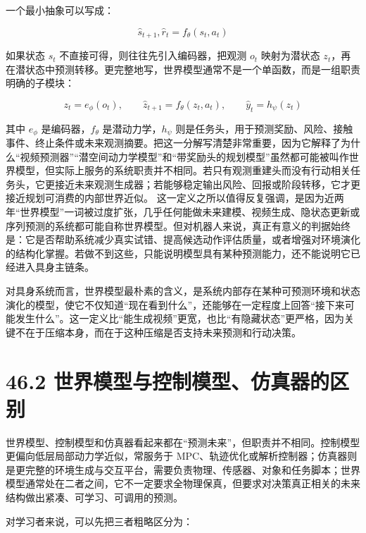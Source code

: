 一个最小抽象可以写成：

\begin{equation*}
\hat{s}_{t+1}, \hat{r}_t = f_\theta(s_t, a_t)
\end{equation*}

如果状态 \(s_t\) 不直接可得，则往往先引入编码器，把观测 \(o_t\) 映射为潜状态 \(z_t\)，再在潜状态中预测转移。更完整地写，世界模型通常不是一个单函数，而是一组职责明确的子模块：

\begingroup
\scriptsize
\begin{equation*}
z_t = e_\phi(o_t), \qquad
\hat{z}_{t+1} = f_\theta(z_t, a_t), \qquad
\hat{y}_t = h_\psi(z_t)
\end{equation*}
\endgroup

其中 \(e_\phi\) 是编码器，\(f_\theta\) 是潜动力学，\(h_\psi\) 则是任务头，用于预测奖励、风险、接触事件、终止条件或未来观测摘要。把这一分解写清楚非常重要，因为它解释了为什么“视频预测器”“潜空间动力学模型”和“带奖励头的规划模型”虽然都可能被叫作世界模型，但实际上服务的系统职责并不相同。若只有观测重建头而没有行动相关任务头，它更接近未来观测生成器；若能够稳定输出风险、回报或阶段转移，它才更接近规划可消费的内部世界近似。 这一定义之所以值得反复强调，是因为近两年“世界模型”一词被过度扩张，几乎任何能做未来建模、视频生成、隐状态更新或序列预测的系统都可能自称世界模型。但对机器人来说，真正有意义的判据始终是：它是否帮助系统减少真实试错、提高候选动作评估质量，或者增强对环境演化的结构化掌握。若做不到这些，只能说明模型具有某种预测能力，还不能说明它已经进入具身主链条。

对具身系统而言，世界模型最朴素的含义，是系统内部存在某种可预测环境和状态演化的模型，使它不仅知道“现在看到什么”，还能够在一定程度上回答“接下来可能发生什么”。这一定义比“能生成视频”更宽，也比“有隐藏状态”更严格，因为关键不在于压缩本身，而在于这种压缩是否支持未来预测和行动决策。

\section*{46.2 世界模型与控制模型、仿真器的区别}


世界模型、控制模型和仿真器看起来都在“预测未来”，但职责并不相同。控制模型更偏向低层局部动力学近似，常服务于 MPC、轨迹优化或解析控制器；仿真器则是更完整的环境生成与交互平台，需要负责物理、传感器、对象和任务脚本；世界模型通常处在二者之间，它不一定要求全物理保真，但要求对决策真正相关的未来结构做出紧凑、可学习、可调用的预测。

对学习者来说，可以先把三者粗略区分为：

